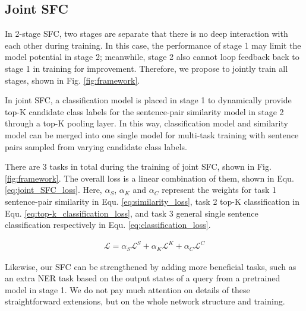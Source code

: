 \subsection{Joint SFC}
In 2-stage SFC, two stages are separate that there is no deep interaction with each other during training. 
In this case, the performance of stage 1 may limit the model potential in stage 2; 
meanwhile, stage 2 also cannot loop feedback back to stage 1 in training for improvement. 
Therefore, we propose to jointly train all stages, shown in Fig. \ref{fig:framework}.

In joint SFC, a classification model is placed in stage 1 to dynamically provide top-K candidate class labels for the sentence-pair similarity model in stage 2 through a top-K pooling layer.
In this way, classification model and similarity model can be merged into one single model for multi-task training with sentence pairs sampled from varying candidate class labels.

There are 3 tasks in total during the training of joint SFC, shown in Fig. \ref{fig:framework}. 
The overall loss is a linear combination of them, shown in Equ. \ref{eq:joint_SFC_loss}. 
Here, $\alpha_S$, $\alpha_K$ and $\alpha_C$ represent the weights for task 1 sentence-pair similarity in Equ. \ref{eq:similarity_loss}, task 2 top-K classification in Equ. \ref{eq:top-k_classification_loss}, and task 3 general single sentence classification respectively in Equ.  \ref{eq:classification_loss}.

\vspace{-1.5em}
\begin{align}
  \mathcal{L} = \alpha_S \mathcal{L}^S + \alpha_K \mathcal{L}^K + \alpha_C \mathcal{L}^C
  \label{eq:joint_SFC_loss}
\end{align}
\vspace{-1.5em}

Likewise, our SFC can be strengthened by adding more beneficial tasks, such as an extra NER task based on the output states of a query from a pretrained model in stage 1. 
We do not pay much attention on details of these straightforward extensions, but on the whole network structure and training.
